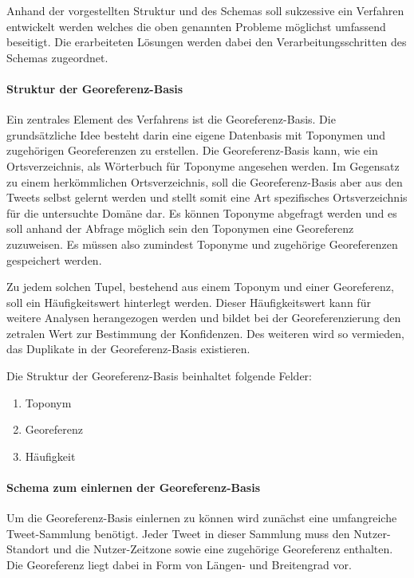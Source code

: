 					Anhand der vorgestellten Struktur und des Schemas soll sukzessive ein Verfahren entwickelt werden welches die oben genannten Probleme möglichst umfassend beseitigt. 
					Die erarbeiteten Lösungen werden dabei den Verarbeitungsschritten des Schemas zugeordnet. 

					\paragraph{Struktur der Georeferenz-Basis} 
						Ein zentrales Element des Verfahrens ist die Georeferenz-Basis.  
					 	Die grundsätzliche Idee besteht darin eine eigene Datenbasis mit Toponymen und zugehörigen Georeferenzen zu erstellen.
						Die Georeferenz-Basis kann, wie ein Ortsverzeichnis, als Wörterbuch für Toponyme angesehen werden.
						Im Gegensatz zu einem herkömmlichen Ortsverzeichnis, soll die Georeferenz-Basis aber aus den Tweets selbst gelernt werden und stellt somit eine Art spezifisches Ortsverzeichnis für die untersuchte Domäne dar.
						Es können Toponyme abgefragt werden und es soll anhand der Abfrage möglich sein den Toponymen eine Georeferenz zuzuweisen.
						Es müssen also zumindest Toponyme und zugehörige Georeferenzen gespeichert werden.

						Zu jedem solchen Tupel, bestehend aus einem Toponym und einer Georeferenz, soll ein Häufigkeitswert hinterlegt werden.
						Dieser Häufigkeitswert kann für weitere Analysen herangezogen werden und bildet bei der Georeferenzierung den zetralen Wert zur Bestimmung der Konfidenzen. 
						Des weiteren wird so vermieden, das Duplikate in der Georeferenz-Basis existieren.

						Die Struktur der Georeferenz-Basis beinhaltet folgende Felder:

						\begin{enumerate}
							\item Toponym
							\item Georeferenz  
							\item Häufigkeit 
						\end{enumerate}


					\paragraph{Schema zum einlernen der Georeferenz-Basis}

					Um die Georeferenz-Basis einlernen zu können wird zunächst eine umfangreiche Tweet-Sammlung benötigt.
					Jeder Tweet in dieser Sammlung muss den Nutzer-Standort und die Nutzer-Zeitzone sowie eine zugehörige Georeferenz enthalten.
					Die Georeferenz liegt dabei in Form von Längen- und Breitengrad vor. 
					
